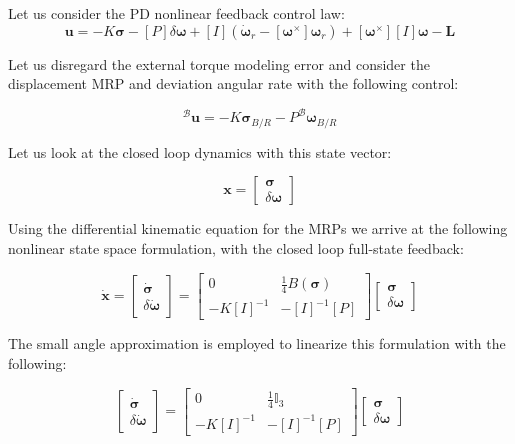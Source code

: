 \documentclass[paper]{aiaaNew}
\begin{document}
Let us consider the PD nonlinear feedback control law: 
\begin{equation}
  \boldsymbol{u}=-K \boldsymbol{\sigma}-[P] \delta \boldsymbol{\omega}+[I]\left(\dot{\boldsymbol{\omega}}_{r}-[{\boldsymbol{\omega}}^\times] \boldsymbol{\omega}_{r}\right)  +[{\boldsymbol{\omega}}^\times][I] \boldsymbol{\omega}-\boldsymbol{L}
\end{equation}

Let us disregard the external torque modeling error and consider the displacement MRP and deviation angular rate with the following control:

\begin{equation}
  ^\mathcal{B}{\boldsymbol{u}}=-K \boldsymbol{\sigma}_{B / R}-P^{\mathcal{B}} \boldsymbol{\omega}_{B / R}
\end{equation}


Let us look at the closed loop dynamics with this state vector: 

\begin{equation}
\boldsymbol{x}= \begin{bmatrix}{\boldsymbol{\sigma}} \\ {\delta \boldsymbol{\omega}}\end{bmatrix}
\end{equation}

Using the differential kinematic equation for the MRPs we arrive at the following nonlinear state space formulation, with the closed loop full-state feedback: 


\begin{equation}
\dot{\boldsymbol{x}}= \begin{bmatrix}{\dot{\boldsymbol{\sigma}}} \\ {\delta \dot{\boldsymbol{\omega}}}\end{bmatrix} =\left[ \begin{array}{cc}{0} & {\frac{1}{4} B(\boldsymbol{\sigma})} \\ {-K[I]^{-1}} & {-[I]^{-1}[P]}\end{array}\right] \begin{bmatrix}{\boldsymbol{\sigma}} \\ {\delta \boldsymbol{\omega}}\end{bmatrix}
\end{equation}

The small angle approximation is employed to linearize this formulation with the following:

\begin{equation}
\begin{bmatrix}{\dot{\boldsymbol{\sigma}}} \\ {\delta \dot{\boldsymbol{\omega}}}\end{bmatrix} =\left[ \begin{array}{cc}{0} & {\frac{1}{4} \mathbb{I}_3 } \\ {-K[I]^{-1}} & {-[I]^{-1}[P]}\end{array}\right] \begin{bmatrix}{\boldsymbol{\sigma}} \\ {\delta \boldsymbol{\omega}}\end{bmatrix}
\end{equation}
\end{document}
